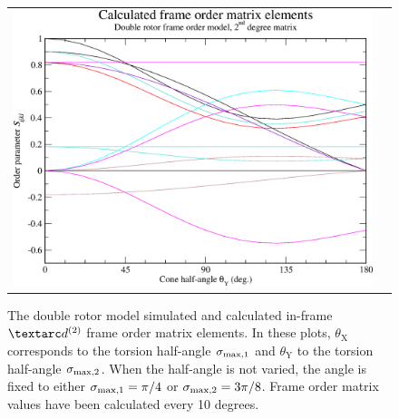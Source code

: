 \begin{figure}
\begin{tabular}{@{}cc@{}}
    \includegraphics[width=.5\textwidth]{images/frame_order_matrix/Sijkl_double_rotor_in_frame_theta_y_calc.eps} \\
  \end{tabular}
  \caption[Double rotor simulated and calculated in-frame Daeg$^{(2)}$ elements.]{
    The double rotor model simulated and calculated in-frame $\FOtwo$ frame order matrix elements.
    In these plots, $\theta_\textrm{X}$ corresponds to the torsion half-angle $\sigma_{\textrm{max,1}}$ and $\theta_\textrm{Y}$ to the torsion half-angle $\sigma_{\textrm{max,2}}$.
    When the half-angle is not varied, the angle is fixed to either $\sigma_{\textrm{max,1}} = \pi/4$ or $\sigma_{\textrm{max,2}} = 3\pi/8$.
    Frame order matrix values have been calculated every 10 degrees.
  }
  \label{fig: simulated and calculated in-frame 2nd degree double rotor frame order}
\end{figure}

